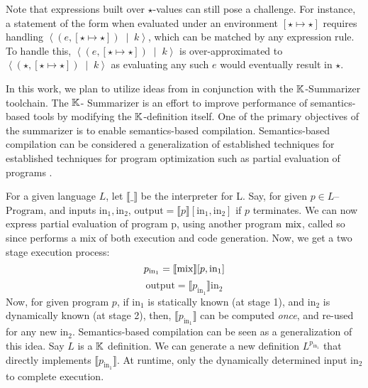 Note that expressions built over $\star$-values can still pose a
challenge. For instance, a statement of the form  when
evaluated under an environment $\left[\star \mapsto \star\right]$ requires
handling $\left\langle \left(e, \left[ \star \mapsto \star \right] \right)\;\mid\; k
\right\rangle$, which can be matched by any expression rule. To handle this,
$\left\langle \left(e, \left[ \star \mapsto \star \right] \right)\;\mid\; k \right\rangle$
is over-approximated to $\left \langle \left(\star, \left[ \star \mapsto \star \right] \right)\;\mid\; k \right\rangle$
as evaluating any such $e$ would eventually result in $\star$.



In this work, we plan to utilize ideas from \cite{KoppelICFP22}
in conjunction with the $\mathbb{K}{}$-Summarizer toolchain. The $\mathbb{K}{}$-
Summarizer is an effort to improve performance of semantics-based tools
by modifying the $\mathbb{K}$-definition itself. One of the primary objectives
of the summarizer is to enable semantics-based compilation.
Semantics-based compilation can be considered a generalization of
established techniques for established techniques for program optimization
such as partial evaluation of programs \cite{Jones93Book}.

For a given language $L$, let $\llbracket\_\rrbracket$ be the
interpreter for L. Say, for given $p \in L$--$\text{Program}$, and inputs
$\text{in}_1, \text{in}_2$,
$\text{output} = \llbracket p \rrbracket\left[\text{in}_1,\text{in}_2\right]$
if $p$ terminates.
We can now express partial evaluation of program p, using another
program $\text{mix}$, called so since performs a mix of both execution and code
generation. Now, we get a two stage execution process:
$$ p_{\text{in}_1} = \llbracket \text{mix} \rrbracket [p, \text{in}_1]$$
$$ \text{output} = \llbracket p_{\text{in}_1} \rrbracket \text{in}_2$$
Now, for given program $p$, if $\text{in}_1$ is statically known (at stage 1),
and $\text{in}_2$ is dynamically known (at stage 2), then,
$\llbracket p_{\text{in}_1} \rrbracket$ can be computed \emph{once}, and
re-used for any new $\text{in}_2$.
Semantics-based compilation can be seen as a generalization of this idea.
Say $L$ is a $\mathbb{K}$ definition. We can generate a new definition
$L^{p_{\text{in}_1}}$ that directly implements $\llbracket p_{\text{in}_1}
\rrbracket$. At runtime, only the dynamically determined input $\text{in}_2$
to complete execution.

